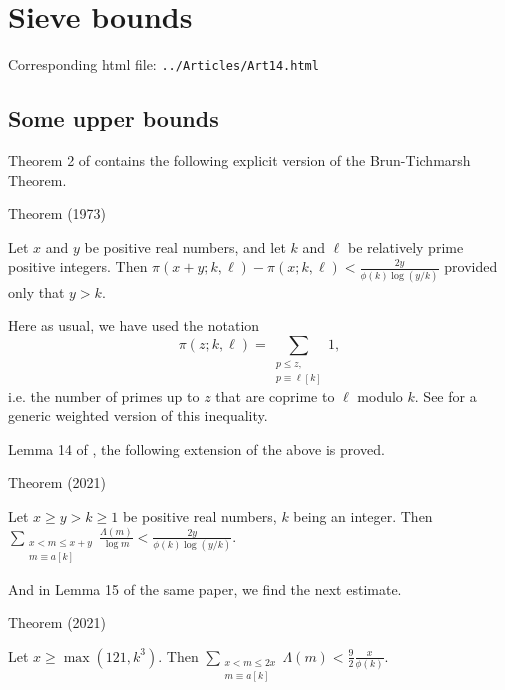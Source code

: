 \chapter{  Sieve bounds}

Corresponding html file: \texttt{../Articles/Art14.html}










 
 

\par 
\section{Some upper bounds}


Theorem 2 of \cite{Montgomery-Vaughan*73} contains the
following explicit version of the Brun-Tichmarsh Theorem.
\par 
\begin{thm}{Theorem (1973)}

Let $x$ and $y$ be positive real numbers, and let $k$ and $\ell$ be relatively
prime positive integers. Then 
$
\pi(x+y;k,\ell)-\pi(x;k,\ell)
<  \frac{2y}{\phi(k)\log (y/k)}
$ provided only that $y>k$.
\end{thm}

Here as usual, we have used the notation
$$
\pi(z;k,\ell)=\sum_{\substack{p\le z,\\ p\equiv \ell [k]}}1,
$$
i.e. the number of primes up to $z$ that are coprime to $\ell$ modulo $k$.
See
\cite{Buethe*14}
for a generic weighted version of this inequality.

Lemma 14 of
\cite{Ramare*13a},
the following extension of the above is proved.
\par 
\begin{thm}{Theorem (2021)}

Let $x\ge y>k\ge 1$ be positive real numbers, $k$ being an integer. Then 
$
\displaystyle
\sum_{\substack{x < m \le x+y\\ m\equiv a[k]}}\frac{\Lambda(m)}{\log m}
<  \frac{2y}{\phi(k)\log (y/k)}.
$
\end{thm}

And in Lemma 15 of the same paper, we find the next estimate.
\par 
\begin{thm}{Theorem (2021)}

Let $x\ge \max(121,k^3)$. Then 
$
\displaystyle
\sum_{\substack{x < m \le 2x\\ m\equiv a[k]}}\Lambda(m)
<  \frac{9}{2}\frac{x}{\phi(k)}.
$
\end{thm}


